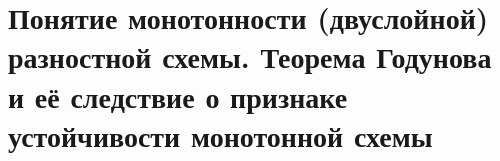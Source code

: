 \documentclass[__main__.tex]{subfiles}
\begin{document}
\section{Понятие монотонности (двуслойной) разностной схемы. Теорема Годунова и её следствие о признаке устойчивости монотонной схемы}
\end{document}
